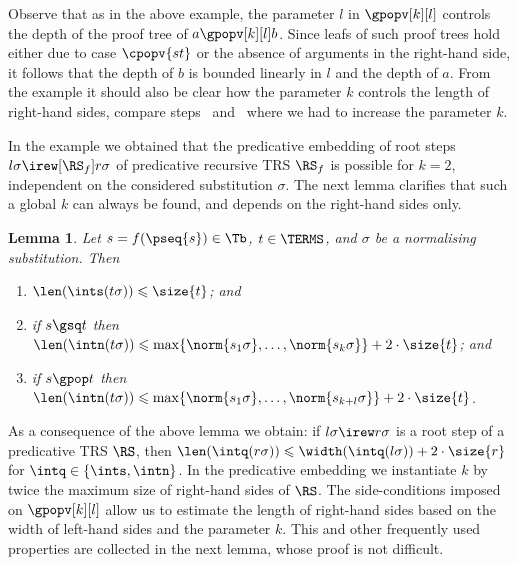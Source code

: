 \documentclass{LMCS}
\newtheorem{lemma}[thm]{Lemma}
\begin{document}
Observe that as in the above example, 
the parameter $l$ in $\gpopv[k][l]$ controls 
the depth of the proof tree of $a \gpopv[k][l] b$. 
Since leafs of such proof trees hold either due to case $\cpopv{st}$
or the absence of arguments in the right-hand side, it follows that 
the depth of $b$ is bounded linearly 
in $l$ and the depth of $a$.
From the example it should also be clear how the parameter $k$ 
controls the length of right-hand sides, 
compare steps~ and~ where we had to increase 
the parameter $k$.

In the example we obtained that the predicative embedding of 
root steps $l\sigma \irew[\RS_f] r\sigma$ 
of predicative recursive TRS $\RS_f$ is possible for $k = 2$, 
independent on the considered substitution $\sigma$. 
The next lemma clarifies that such a global $k$ can always be found, 
and depends on the right-hand sides only. 

\begin{lemma}\label{l:int:len}
  Let $s = f(\pseq{s}) \in \Tb$, $t \in \TERMS$, and $\sigma$ be a normalising substitution. Then
  \begin{enumerate}[labelsep=*,leftmargin=*]
  \item\label{l:int:len:S} $\len(\ints(t\sigma)) \leqslant \size{t}$; and
  \item\label{l:int:len:gsq} if $s \gsq t$  then $\len(\intn(t\sigma)) \leqslant \max \{ \norm{s_1\sigma}, \dots, \norm{s_k\sigma} \} + 2\cdot\size{t}$; and
  \item\label{l:int:len:gpop} if $s \gpop t$ then $\len(\intn(t\sigma)) \leqslant \max \{ \norm{s_1\sigma}, \dots, \norm{s_{k+l}\sigma}\} + 2\cdot\size{t}$.
  \end{enumerate}
\end{lemma}






As a consequence of the above lemma we obtain: if $l\sigma \irew r\sigma$ is a root step of 
a predicative TRS $\RS$, then 
$\len(\intq(r\sigma)) \leqslant \width(\intq(l\sigma)) + 2 \cdot \size{r}$ 
for $\intq \in \{\ints,\intn\}$. 
In the predicative embedding we instantiate 
$k$ by twice the maximum size of right-hand sides of $\RS$.
The side-conditions imposed on $\gpopv[k][l]$ 
allow us to estimate the length of right-hand sides based on 
the width of left-hand sides and the parameter $k$.
This and other frequently used properties are collected in the next lemma,
whose proof is not difficult.
\end{document}
